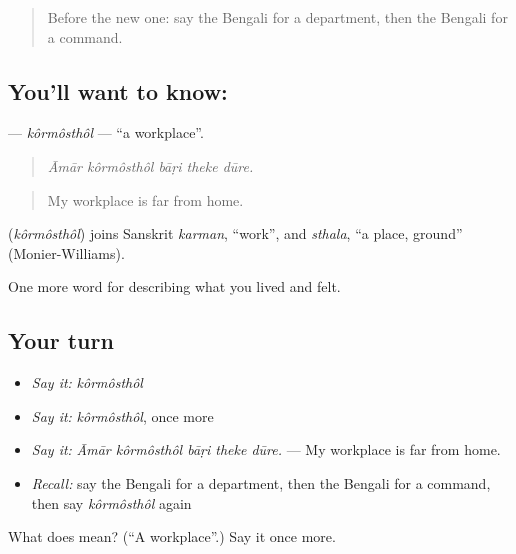\begin{quote}
Before the new one: say the Bengali for a department, then the Bengali for a command.
\end{quote}

\subsection*{You'll want to know: }
\textbf{} — \emph{kôrmôsthôl} — \textquotedblleft{}a workplace\textquotedblright{}.

\begin{quote}
    
\end{quote}

\begin{quote}
\emph{Āmār kôrmôsthôl bāṛi theke dūre.}
\end{quote}

\begin{quote}
My workplace is far from home.
\end{quote}

\begin{cousinweb}
\textbf{} (\emph{kôrmôsthôl}) joins Sanskrit \emph{karman}, \textquotedblleft{}work\textquotedblright{}, and \emph{sthala}, \textquotedblleft{}a place, ground\textquotedblright{} (Monier-Williams).
\end{cousinweb}

\begin{grammarlens}[title={What you've built}]
One more word for describing what you lived and felt.
\end{grammarlens}

\subsection*{Your turn}
\begin{itemize}
\raggedright
  \item \emph{Say it:} \emph{kôrmôsthôl}
  \item \emph{Say it:} \emph{kôrmôsthôl}, once more
  \item \emph{Say it:} \emph{Āmār kôrmôsthôl bāṛi theke dūre.} — My workplace is far from home.
  \item \emph{Recall:} say the Bengali for a department, then the Bengali for a command, then say \emph{kôrmôsthôl} again
\end{itemize}

\begin{tcolorbox}[breakable,colback=teal!4,colframe=teal!35!black,title={Before you move on}]
What does  mean? (\textquotedblleft{}A workplace\textquotedblright{}.) Say it once more.
\end{tcolorbox}
